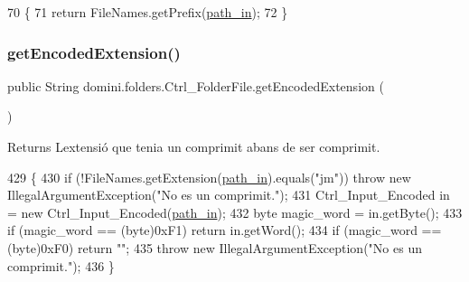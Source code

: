 \begin{DoxyCode}
70                                        \{
71         \textcolor{keywordflow}{return} FileNames.getPrefix(\hyperlink{classdomini_1_1folders_1_1Ctrl__FolderFile_a0d3946bb2832a1f34d0c2227df5c71c4}{path\_in});
72     \}
\end{DoxyCode}
\mbox{\label{classdomini_1_1folders_1_1Ctrl__FolderFile_a61d9dfde0932787a2398af3ddf99c34b}} 
\subsubsection{\texorpdfstring{get\+Encoded\+Extension()}{getEncodedExtension()}}
{\footnotesize\ttfamily public String domini.\+folders.\+Ctrl\+\_\+\+Folder\+File.\+get\+Encoded\+Extension (\begin{DoxyParamCaption}{ }\end{DoxyParamCaption})\hspace{0.3cm}{\ttfamily [inline]}}

\begin{DoxyReturn}{Returns}
L\textquotesingle{}extensió que tenia un comprimit abans de ser comprimit. 
\end{DoxyReturn}

\begin{DoxyCode}
429                                         \{
430         \textcolor{keywordflow}{if} (!FileNames.getExtension(\hyperlink{classdomini_1_1folders_1_1Ctrl__FolderFile_a0d3946bb2832a1f34d0c2227df5c71c4}{path\_in}).equals(\textcolor{stringliteral}{"jm"})) \textcolor{keywordflow}{throw} \textcolor{keyword}{new} IllegalArgumentException(\textcolor{stringliteral}{"No es
       un comprimit."});
431         Ctrl\_Input\_Encoded in = \textcolor{keyword}{new} Ctrl\_Input\_Encoded(\hyperlink{classdomini_1_1folders_1_1Ctrl__FolderFile_a0d3946bb2832a1f34d0c2227df5c71c4}{path\_in});
432         byte magic\_word = in.getByte();
433         \textcolor{keywordflow}{if} (magic\_word == (byte)0xF1) \textcolor{keywordflow}{return} in.getWord();
434         \textcolor{keywordflow}{if} (magic\_word == (byte)0xF0) \textcolor{keywordflow}{return} \textcolor{stringliteral}{""};
435         \textcolor{keywordflow}{throw} \textcolor{keyword}{new} IllegalArgumentException(\textcolor{stringliteral}{"No es un comprimit."});
436     \}
\end{DoxyCode}
\mbox{\label{classdomini_1_1folders_1_1Ctrl__FolderFile_a9e2ef751bdcb99083831c6b4e4761169}} 
